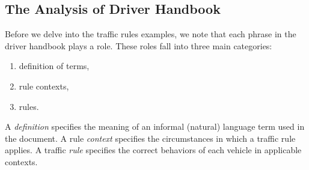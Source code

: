 \subsection{The Analysis of Driver Handbook}
\label{sec:rules-analysis}
Before we delve into the traffic rules examples,
we note that each phrase in the driver handbook plays a role.
These roles fall into three main categories:
\begin{enumerate}
\item definition of terms,
\item rule contexts,
\item rules.
\end{enumerate}
A \emph{definition} specifies the meaning of an informal (natural) language term used in the document.
A rule \emph{context} specifies the circumstances in which a traffic rule applies.
A traffic \emph{rule} specifies the correct behaviors of each vehicle in applicable contexts.

